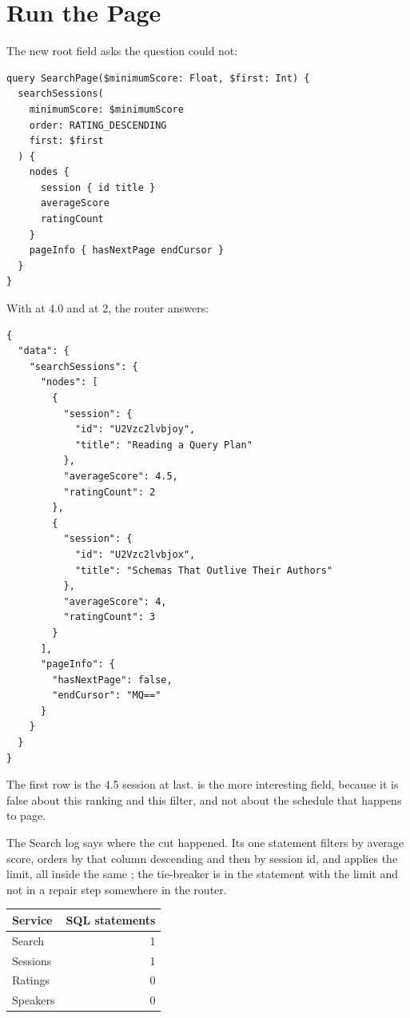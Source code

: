 \section{Run the Page}
\label{sec:ch13-run-the-page}

%
The new root field asks the question  could not:

\begin{verbatim}
query SearchPage($minimumScore: Float, $first: Int) {
  searchSessions(
    minimumScore: $minimumScore
    order: RATING_DESCENDING
    first: $first
  ) {
    nodes {
      session { id title }
      averageScore
      ratingCount
    }
    pageInfo { hasNextPage endCursor }
  }
}
\end{verbatim}

With  at 4.0 and  at 2, the router answers:

\begin{verbatim}
{
  "data": {
    "searchSessions": {
      "nodes": [
        {
          "session": {
            "id": "U2Vzc2lvbjoy",
            "title": "Reading a Query Plan"
          },
          "averageScore": 4.5,
          "ratingCount": 2
        },
        {
          "session": {
            "id": "U2Vzc2lvbjox",
            "title": "Schemas That Outlive Their Authors"
          },
          "averageScore": 4,
          "ratingCount": 3
        }
      ],
      "pageInfo": {
        "hasNextPage": false,
        "endCursor": "MQ=="
      }
    }
  }
}
\end{verbatim}

The first row is the 4.5 session at last.  is the more
interesting field, because it is false about this ranking and this filter,
and not about the schedule that  happens to page.

%
The Search log says where the cut happened. Its one statement filters by
average score, orders by that column descending and then by session id, and
applies the limit, all inside the same ; the tie-breaker is in
the statement with the limit and not in a repair step somewhere in the router.

\begin{center}
\begin{tabular}{@{}lr@{}}
\toprule
Service & SQL statements \\
\midrule
Search & 1 \\
Sessions & 1 \\
Ratings & 0 \\
Speakers & 0 \\
\bottomrule
\end{tabular}
\end{center}

